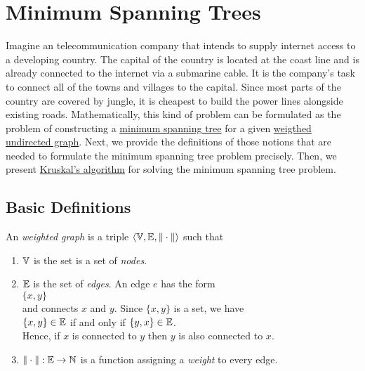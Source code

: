 \pagebreak

\section{Minimum Spanning Trees}
Imagine an telecommunication company that intends to supply internet access to a developing country.
The capital of the country is located at the coast line and is already connected to the internet via
a submarine cable. It is the company's task to connect all of the towns and villages to the capital.
Since most parts of the country are covered by jungle, it is cheapest to build the power lines
alongside existing roads.  Mathematically, this kind of problem can be formulated as the problem of
constructing a \href{https://en.wikipedia.org/wiki/Minimum_spanning_tree}{minimum spanning tree} for
a given \href{https://en.wikipedia.org/wiki/Graph_(discrete_mathematics)#Weighted_graph}{weigthed}
\href{https://en.wikipedia.org/wiki/Graph_(discrete_mathematics)#Undirected_graph}{undirected graph}.
Next, we provide the definitions of those notions that are needed to formulate the minimum spanning
tree problem precisely.  Then, we present
\href{https://en.wikipedia.org/wiki/Kruskal%27s_algorithm}{Kruskal's algorithm} for solving the
minimum spanning tree problem. 

\subsection{Basic Definitions}
\begin{Definition} An \emph{weighted graph} is a triple 
   $\langle {\mathbb V}, {\mathbb E}, \|\cdot\| \rangle$ such that
  \begin{enumerate}
  \item ${\mathbb V}$ is the set is a set of  \emph{nodes}.
  \item ${\mathbb E}$ is the set of  \emph{edges}.  An edge $e$ has the form
        \\[0.2cm]
        \hspace*{1.3cm}
        $\{x, y\}$
        \\[0.2cm]
        and connects $x$ and $y$.  Since $\{x,y\}$ is a set, we have
        \\[0.2cm]
        \hspace*{1.3cm}
        $\{x,y\} \in {\mathbb E}$ \quad if and only if $\{y,x\} \in {\mathbb E}$.
        \\[0.2cm]
        Hence, if $x$ is connected to $y$ then $y$ is also connected to $x$.
  \item $\|\cdot\|: {\mathbb E} \rightarrow {\mathbb N}$ is a function assigning a \emph{weight} to every edge.
        \conclude
  \end{enumerate}
\end{Definition}

